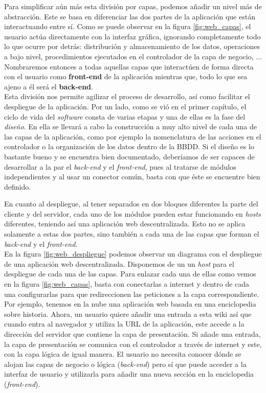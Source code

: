 \documentclass[../main.tex]{subfiles}
\begin{document}
    Para simplificar aún más esta división por capas, podemos añadir un nivel más de abstracción. Este se basa en diferenciar las dos partes de la aplicación que están interactuando entre sí. Como se puede observar en la figura \ref{fig:web_capas}, el usuario actúa directamente con la interfaz gráfica, ignorando completamente todo lo que ocurre por detrás: distribución y almacenamiento de los datos, operaciones a bajo nivel, procedimientos ejecutados en el controlador de la capa de negocio, ... Nombraremos entonces a todas aquellas capas que interactúen de forma directa con el usuario como \textbf{front-end} de la aplicación mientras que, todo lo que sea ajeno a él será el \textbf{back-end}. \\
    
    Esta división nos permite agilizar el proceso de desarrollo, así como facilitar el despliegue de la aplicación. Por un lado, como se vió en el primer capítulo, el ciclo de vida del \textit{software} consta de varias etapas y una de ellas es la fase del \textit{diseño}. En ella se llevará a cabo la construcción a muy alto nivel de cada una de las capas de la aplicación, como por ejemplo la nomenclatura de las acciones en el controlador o la organización de los datos dentro de la BBDD. Si el diseño es lo bastante bueno y se encuentra bien documentado, deberíamos de ser capaces de desarrollar a la par el \textit{back-end} y el \textit{front-end}, pues al tratarse de módulos independientes y al usar un conector común, basta con que éste se encuentre bien definido. 
    
    En cuanto al despliegue, al tener separados en dos bloques diferentes la parte del cliente y del servidor, cada uno de los módulos pueden estar funcionando en \textit{hosts} diferentes, teniendo así una aplicación web descentralizada. Esto no se aplica solamente a estas dos partes, sino también a cada una de las capas que forman el \textit{back-end} y el \textit{front-end}. \\
    
    En la figura \ref{fig:web_despliegue} podemos observar un diagrama con el despliegue de una aplicación web descentralizada. Disponemos de un un \textit{host} para el despliegue de cada una de las capas. Para enlazar cada una de ellas como vemos en la figura \ref{fig:web_capas}, basta con conectarlas a internet y dentro de cada una configurarlas para que redireccionen las peticiones a la capa correspondiente. Por ejemplo, tenemos en la nube una aplicación web basada en una enciclopedia sobre historia. Ahora, un usuario quiere añadir una entrada a esta wiki así que cuando entra al navegador y utiliza la URL de la aplicación, este accede a la dirección del servidor que contiene la capa de presentación. Si añade una entrada, la capa de presentación se comunica con el controlador a través de internet y este, con la capa lógica de igual manera. El usuario no necesita conocer dónde se alojan las capas de negocio o lógica (\textit{back-end}) pero sí que puede acceder a la interfaz de usuario y utilizarla para añadir una nueva sección en la enciclopedia (\textit{front-end}).\\
 
\end{document}
